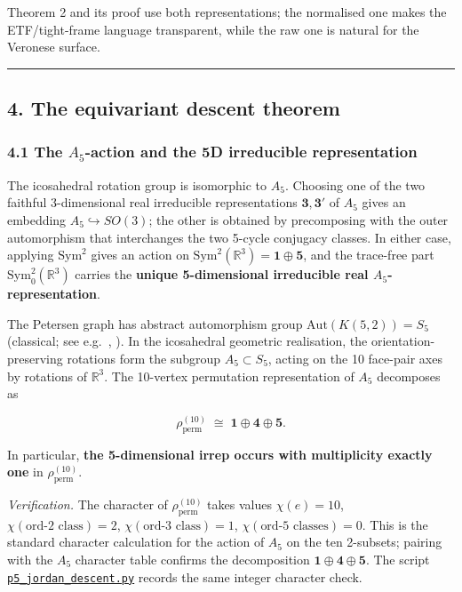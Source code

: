 \documentclass[
]{article}
\begin{document}
Theorem 2 and its proof use both representations; the normalised one
makes the ETF/tight-frame language transparent, while the raw one is
natural for the Veronese surface.

\begin{center}\rule{0.5\linewidth}{0.5pt}\end{center}

\subsection{4. The equivariant descent
theorem}\label{the-equivariant-descent-theorem}

\subsubsection{\texorpdfstring{4.1 The \(A_5\)-action and the 5D
irreducible
representation}{4.1 The A\_5-action and the 5D irreducible representation}}\label{the-a_5-action-and-the-5d-irreducible-representation}

The icosahedral rotation group is isomorphic to \(A_5\). Choosing one of
the two faithful 3-dimensional real irreducible representations
\(\mathbf 3, \mathbf 3'\) of \(A_5\) gives an embedding
\(A_5 \hookrightarrow SO(3)\); the other is obtained by precomposing
with the outer automorphism that interchanges the two 5-cycle conjugacy
classes. In either case, applying \(\mathrm{Sym}^2\) gives an action on
\(\mathrm{Sym}^2(\mathbb{R}^3) = \mathbf{1} \oplus \mathbf{5}\), and the
trace-free part \(\mathrm{Sym}^2_0(\mathbb{R}^3)\) carries the
\textbf{unique 5-dimensional irreducible real \(A_5\)-representation}.

The Petersen graph has abstract automorphism group
\(\mathrm{Aut}(K(5,2)) = S_5\) (classical; see e.g.~\cite{God93},
\cite{BCN89}). In the icosahedral geometric realisation, the
orientation-preserving rotations form the subgroup \(A_5 \subset S_5\),
acting on the 10 face-pair axes by rotations of \(\mathbb{R}^3\). The
10-vertex permutation representation of \(A_5\) decomposes as

\[
\rho_{\mathrm{perm}}^{(10)} \;\cong\; \mathbf{1} \oplus \mathbf{4} \oplus \mathbf{5}.
\]

In particular, \textbf{the 5-dimensional irrep occurs with multiplicity
exactly one} in \(\rho_{\mathrm{perm}}^{(10)}\).

\emph{Verification.} The character of \(\rho_{\mathrm{perm}}^{(10)}\)
takes values \(\chi(e) = 10\), \(\chi(\text{ord-2 class}) = 2\),
\(\chi(\text{ord-3 class}) = 1\), \(\chi(\text{ord-5 classes}) = 0\).
This is the standard character calculation for the action of \(A_5\) on
the ten 2-subsets; pairing with the \(A_5\) character table confirms the
decomposition \(\mathbf{1} \oplus \mathbf{4} \oplus \mathbf{5}\). The
script
\href{../scripts/p5_jordan_descent.py}{\texttt{p5\_jordan\_descent.py}}
records the same integer character check.
\end{document}
